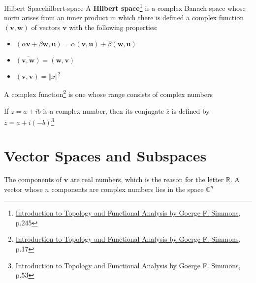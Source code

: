 \begin{Definition}{Hilbert Space}{hilbert-space}
    A \textbf{Hilbert space}\footnote{\href{https://trello.com/c/3EPccNTa}{Introduction to Topology and Functional Analysis by Goerge F. Simmons}, p.245}
    is a complex Banach space whose norm arises from an inner product in which there is defined a complex function
    $(\boldsymbol{v}, \boldsymbol{w})$ of vectors $\boldsymbol{v}$ with the following properties:

    \begin{itemize}
        \item $(\alpha \boldsymbol{v} + \beta \boldsymbol{w}, \boldsymbol{u}) = \alpha(\boldsymbol{v}, \boldsymbol{u}) + \beta(\boldsymbol{w}, \boldsymbol{u})$
        \item $\overline{(\boldsymbol{v}, \boldsymbol{w})} = (\boldsymbol{w}, \boldsymbol{v})$
        \item $(\boldsymbol{v}, \boldsymbol{v}) = \Vert x \Vert^2$
    \end{itemize}

    \tcblower

    A complex function\footnote{\href{https://trello.com/c/3EPccNTa}{Introduction to Topology and Functional Analysis by Goerge F. Simmons}, p.17}
    is one whose range consists of complex numbers

    If $z = a + ib$ is a complex number, then its conjugate $\overline{z}$ is defined by $\overline{z} = a + i(-b)$\footnote{\href{https://trello.com/c/3EPccNTa}{Introduction to Topology and Functional Analysis by Goerge F. Simmons}, p.53}
\end{Definition}

\section{Vector Spaces and Subspaces}


The components of $\boldsymbol{v}$ are real numbers, which is the reason for the letter $\mathbb{R}$. A vector whose $n$
components are complex numbers lies in the space $\mathbb{C}^n$

